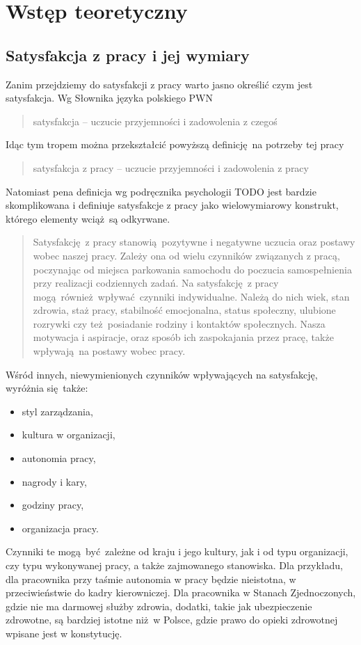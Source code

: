 \section{Wstęp teoretyczny}
\subsection{Satysfakcja z pracy i jej wymiary}
Zanim przejdziemy do satysfakcji z pracy warto jasno określić czym jest satysfakcja. Wg Słownika języka polskiego PWN
\begin{quote}
satysfakcja -- uczucie przyjemności i zadowolenia z czegoś
\end{quote}
Idąc tym tropem można przekształcić powyższą definicję na potrzeby tej pracy
\begin{quote}
satysfakcja z pracy -- uczucie przyjemności i zadowolenia z pracy
\end{quote}

Natomiast pena definicja wg podręcznika psychologii TODO jest bardzie skomplikowana i definiuje satysfakcje z pracy jako wielowymiarowy konstrukt, którego elementy wciąż są odkyrwane.

\begin{quotation}
Satysfakcję z pracy stanowią pozytywne i negatywne uczucia oraz postawy wobec naszej pracy. Zależy ona od wielu czynników związanych z pracą, poczynając od miejsca parkowania samochodu do poczucia samospełnienia przy realizacji codziennych zadań. Na satysfakcję z pracy mogą również wpływać czynniki indywidualne. Należą do nich wiek, stan zdrowia, staż pracy, stabilność emocjonalna, status społeczny, ulubione rozrywki czy też posiadanie rodziny i kontaktów społecznych. Nasza motywacja i
aspiracje, oraz sposób ich zaspokajania przez pracę, także wpływają na postawy wobec pracy.
\end{quotation}
Wśród innych, niewymienionych czynników wpływających na satysfakcję, wyróżnia się także:
\begin{itemize}
\item styl zarządzania,
\item kultura w organizacji,
\item autonomia pracy,
\item nagrody i kary,
\item godziny pracy,
\item organizacja pracy.
\end{itemize}
Czynniki te mogą być zależne od kraju i jego kultury, jak i od typu organizacji, czy typu wykonywanej pracy, a także zajmowanego stanowiska. Dla przykładu, dla pracownika przy taśmie autonomia w pracy będzie nieistotna, w przeciwieństwie do kadry kierowniczej. Dla pracownika w Stanach Zjednoczonych, gdzie nie ma darmowej służby zdrowia, dodatki, takie jak ubezpieczenie zdrowotne, są bardziej istotne niż w Polsce, gdzie prawo do opieki zdrowotnej wpisane jest w konstytucję. 

